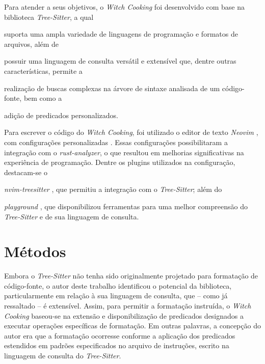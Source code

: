 \documentclass
  [11pt,a4paper,english,brazil,openright,sumario=tradicional,twoside]
  {abntex2}
\newcommand{\treesitter}{\textit{Tree-Sitter}\xspace}
\newcommand{\witchcooking}{\textit{Witch Cooking}\xspace}
\begin{document}
  Para atender a seus objetivos, o \witchcooking foi desenvolvido com base na
  biblioteca \treesitter \cite{tree-sitter-2018-tree}, a qual
  \begin{inparaenum}
    \item suporta uma ampla variedade de linguagens de programação e formatos
          de arquivos, além de
    \item possuir uma linguagem de consulta versátil e extensível que, dentre
          outras características, permite a
          \begin{inparaenum}
            \item realização de buscas complexas na árvore de sintaxe analisada
                  de um código-fonte, bem como a
            \item adição de predicados personalizados.
          \end{inparaenum}
  \end{inparaenum}

  Para escrever o código do \witchcooking, foi utilizado o editor de texto
  \textit{Neovim} \cite{neovim-2023-hyperextensible}, com configurações
  personalizadas \cite{silva-2023-uma}. Essas configurações possibilitaram a
  integração com o \textit{rust-analyzer}, o que resultou em melhorias
  significativas na experiência de programação. Dentre os plugins utilizados na
  configuração, destacam-se o
  \begin{inparaenum}
    \item \textit{nvim-treesitter} \cite{nvim-treesitter-2023-nvim}, que
          permitiu a integração com o \treesitter; além do
    \item \textit{playground} \cite{nvim-treesitter-2023-playground}, que
          disponibilizou ferramentas para uma melhor compreensão do \treesitter
          e de sua linguagem de consulta.
  \end{inparaenum}

  \section{Métodos}

  Embora o \treesitter não tenha sido originalmente projetado para formatação
  de código-fonte, o autor deste trabalho identificou o potencial da
  biblioteca, particularmente em relação à sua linguagem de consulta, que --
  como já ressaltado -- é extensível. Assim, para permitir a formatação
  instruída, o \witchcooking baseou-se na extensão e disponibilização de
  predicados designados a executar operações específicas de formatação. Em
  outras palavras, a concepção do autor era que a formatação ocorresse conforme
  a aplicação dos predicados estendidos em padrões especificados no arquivo de
  instruções, escrito na linguagem de consulta do \treesitter.
\end{document}
